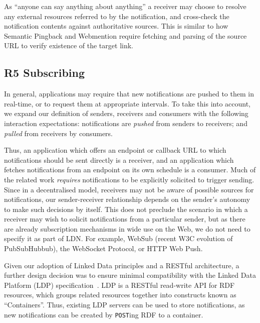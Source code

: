 \documentclass[a4paper]{llncs}
\begin{document}
\par As ``anyone can say anything about anything'' a receiver may choose to resolve any external resources referred to by the notification, and cross-check the notification contents against authoritative sources. This is similar to how Semantic Pingback and Webmention require fetching and parsing of the source URL to verify existence of the target link.





                                \subsection{R5 Subscribing}
  \label{subscribing}



\par In general, applications may require that new notifications are pushed to them in real-time, or to request them at appropriate intervals. To take this into account, we expand our definition of senders, receivers and consumers with the following interaction expectations: notifications are {\em pushed} from senders to receivers; and {\em pulled} from receivers by consumers.


\par Thus, an application which offers an endpoint or callback URL to which notifications should be sent directly is a receiver, and an application which fetches notifications from an endpoint on its own schedule is a consumer. Much of the related work {\em requires} notifications to be explicitly solicited to trigger sending. Since in a decentralised model, receivers may not be aware of possible sources for notifications, our sender-receiver relationship depends on the sender’s autonomy to make such decisions by itself. This does not preclude the scenario in which a receiver may wish to solicit notifications from a particular sender, but as there are already subscription mechanisms in wide use on the Web, we do not need to specify it as part of LDN. For example, \empty WebSub (recent W3C evolution of PubSubHubbub), the WebSocket Protocol, or HTTP Web Push.




\par Given our adoption of Linked Data principles and a RESTful architecture, a further design decision was to ensure minimal compatibility with the \empty Linked Data Platform (LDP) specification~\cite{ref-16}. LDP is a RESTful read-write API for RDF resources, which groups related resources together into constructs known as ``Containers''. Thus, existing LDP servers can be used to store notifications, as new notifications can be created by {\tt POST}ing RDF to a container.
\end{document}

